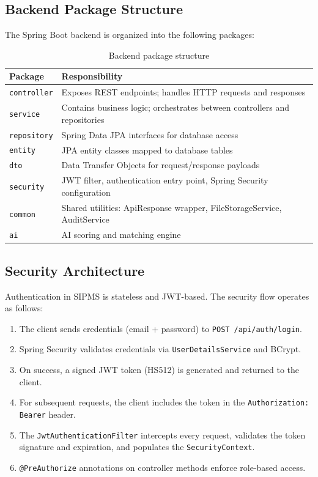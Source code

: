 \subsection{Backend Package Structure}
The Spring Boot backend is organized into the following packages:

\begin{table}[H]
\centering
\begin{tabular}{|p{4.5cm}|p{8.5cm}|}
\hline
\rowcolor{gray!20}
\textbf{Package} & \textbf{Responsibility} \\
\hline
\texttt{controller} & Exposes REST endpoints; handles HTTP requests and responses \\
\hline
\texttt{service} & Contains business logic; orchestrates between controllers and repositories \\
\hline
\texttt{repository} & Spring Data JPA interfaces for database access \\
\hline
\texttt{entity} & JPA entity classes mapped to database tables \\
\hline
\texttt{dto} & Data Transfer Objects for request/response payloads \\
\hline
\texttt{security} & JWT filter, authentication entry point, Spring Security configuration \\
\hline
\texttt{common} & Shared utilities: ApiResponse wrapper, FileStorageService, AuditService \\
\hline
\texttt{ai} & AI scoring and matching engine \\
\hline
\end{tabular}
\caption{Backend package structure}
\end{table}

\subsection{Security Architecture}
Authentication in SIPMS is stateless and JWT-based. The security flow operates as follows:

\begin{enumerate}
    \item The client sends credentials (email + password) to \texttt{POST /api/auth/login}.
    \item Spring Security validates credentials via \texttt{UserDetailsService} and BCrypt.
    \item On success, a signed JWT token (HS512) is generated and returned to the client.
    \item For subsequent requests, the client includes the token in the \texttt{Authorization: Bearer} header.
    \item The \texttt{JwtAuthenticationFilter} intercepts every request, validates the token signature and expiration, and populates the \texttt{SecurityContext}.
    \item \texttt{@PreAuthorize} annotations on controller methods enforce role-based access.
\end{enumerate}

